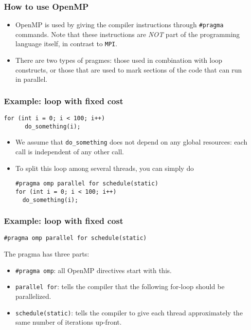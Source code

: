 \begin{frame}
  \frametitle{How to use OpenMP}
  \begin{itemize}
  \item OpenMP is used by giving the compiler instructions through
    \texttt{\#pragma} commands. Note that these instructions are \emph{NOT} part
    of the programming language itself, in contrast to \texttt{MPI}.
  \item There are two types of pragmes: those used in combination with loop
    constructs, or those that are used to mark sections of the code that can run
    in parallel.
  \end{itemize}
\end{frame}

\begin{frame}[fragile]
  \frametitle{Example: loop with fixed cost}
  \begin{lstlisting}[style=c]
    for (int i = 0; i < 100; i++)
      do_something(i);
  \end{lstlisting}
  \begin{itemize}
  \item We assume that \texttt{do\_something} does not depend on any global
    resources: each call is independent of any other call.
  \item To split this loop among several threads, you can simply do
    \begin{lstlisting}[style=c]
#pragma omp parallel for schedule(static)
for (int i = 0; i < 100; i++)
  do_something(i);
    \end{lstlisting}
  \end{itemize}
\end{frame}

\begin{frame}[fragile]
  \frametitle{Example: loop with fixed cost}
  \begin{lstlisting}[style=c]
    #pragma omp parallel for schedule(static)
  \end{lstlisting}
  The pragma has three parts:
  \begin{itemize}
  \item \texttt{\#pragma omp}: all OpenMP directives start with this.
  \item \texttt{parallel for}: tells the compiler that the following for-loop
    should be parallelized.
  \item \texttt{schedule(static)}: tells the compiler to give each thread
    approximately the same number of iterations up-front.
  \end{itemize}
\end{frame}

